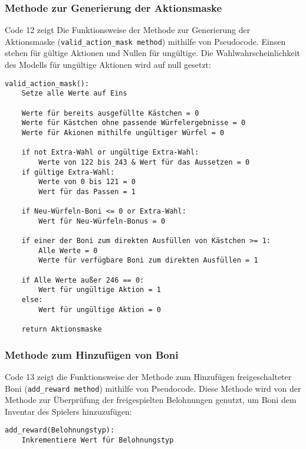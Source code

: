 \subsubsection{Methode zur Generierung der Aktionsmaske}
\begin{minipage}{\linewidth}
Code 12 zeigt Die Funktionsweise der Methode zur Generierung der Aktionsmaske (\texttt{valid\_action\_mask method}) mithilfe von Pseudocode. Einsen stehen für gültige Aktionen und Nullen für ungültige. Die Wahlwahrscheinlichkeit des Modells für ungültige Aktionen wird auf null gesetzt:
\vspace{0.5cm}
\begin{lstlisting}[caption={Methode zur Generierung der Aktionsmaske}]
valid_action_mask():
	Setze alle Werte auf Eins
	
	Werte für bereits ausgefüllte Kästchen = 0
	Werte für Kästchen ohne passende Würfelergebnisse = 0
	Werte für Akionen mithilfe ungültiger Würfel = 0
	
	if not Extra-Wahl or ungültige Extra-Wahl:
		Werte von 122 bis 243 & Wert für das Aussetzen = 0
	if gültige Extra-Wahl:
		Werte von 0 bis 121 = 0
		Wert für das Passen = 1
	
	if Neu-Würfeln-Boni <= 0 or Extra-Wahl:
		Wert für Neu-Würfeln-Bonus = 0
	
	if einer der Boni zum direkten Ausfüllen von Kästchen >= 1:
		Alle Werte = 0
		Werte für verfügbare Boni zum direkten Ausfüllen = 1
	
	if Alle Werte außer 246 == 0:
		Wert für ungültige Aktion = 1
	else:
		Wert für ungültige Aktion = 0
		
	return Aktionsmaske
\end{lstlisting}
\end{minipage}
\subsubsection{Methode zum Hinzufügen von Boni}
\begin{minipage}{\linewidth}
Code 13 zeigt die Funktionsweise der Methode zum Hinzufügen freigeschalteter Boni (\texttt{add\_reward method}) mithilfe von Pseudocode. Diese Methode wird von der Methode zur Überprüfung der freigespielten Belohnungen genutzt, um Boni dem Inventar des Spielers hinzuzufügen:
\vspace{0.5cm}
\begin{lstlisting}[caption={Methode zum Hinzufügen freigschalteter Boni},morekeywords={Belohnungstyp}]
add_reward(Belohnungstyp):
	Inkrementiere Wert für Belohnungstyp
\end{lstlisting}
\end{minipage}


